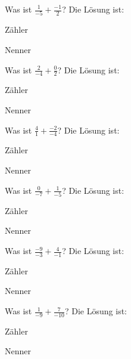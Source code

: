 \documentclass{ximera}
\begin{document}
\begin{shuffle}
\begin{question}
Was ist $\frac{1}{-5} + \frac{-1}{2}$?
Die Lösung ist:
\begin{solution}
Zähler 
\end{solution}
\begin{solution}
Nenner 
\end{solution}
\end{question}


\begin{question}
Was ist $\frac{2}{-4} + \frac{0}{2}$?
Die Lösung ist:
\begin{solution}
Zähler 
\end{solution}
\begin{solution}
Nenner 
\end{solution}
\end{question}


\begin{question}
Was ist $\frac{4}{1} + \frac{-2}{-4}$?
Die Lösung ist:
\begin{solution}
Zähler 
\end{solution}
\begin{solution}
Nenner 
\end{solution}
\end{question}


\begin{question}
Was ist $\frac{0}{-7} + \frac{1}{-5}$?
Die Lösung ist:
\begin{solution}
Zähler 
\end{solution}
\begin{solution}
Nenner 
\end{solution}
\end{question}


\begin{question}
Was ist $\frac{-9}{-3} + \frac{4}{-1}$?
Die Lösung ist:
\begin{solution}
Zähler 
\end{solution}
\begin{solution}
Nenner 
\end{solution}
\end{question}


\begin{question}
Was ist $\frac{1}{-9} + \frac{7}{-10}$?
Die Lösung ist:
\begin{solution}
Zähler 
\end{solution}
\begin{solution}
Nenner 
\end{solution}
\end{question}



\end{shuffle}
\end{document}
